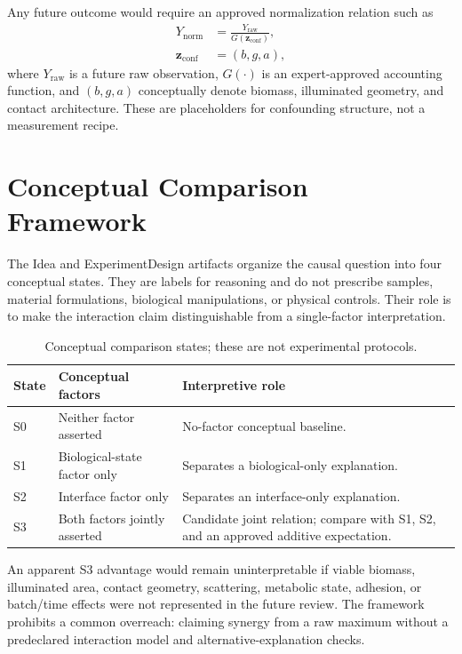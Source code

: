\documentclass[conference]{IEEEtran}
\begin{document}
Any future outcome would require an approved normalization relation such as
\begin{equation}
  \begin{aligned}
    Y_{\mathrm{norm}} &=
    \frac{Y_{\mathrm{raw}}}{G(\mathbf{z}_{\mathrm{conf}})},\\
    \mathbf{z}_{\mathrm{conf}} &= (b,g,a),
  \end{aligned}
  \label{eq:normalization}
\end{equation}
where $Y_{\mathrm{raw}}$ is a future raw observation, $G(\cdot)$ is an expert-approved accounting function, and $(b,g,a)$ conceptually denote biomass, illuminated geometry, and contact architecture. These are placeholders for confounding structure, not a measurement recipe.

\section{Conceptual Comparison Framework}

The Idea and ExperimentDesign artifacts organize the causal question into four conceptual states. They are labels for reasoning and do not prescribe samples, material formulations, biological manipulations, or physical controls. Their role is to make the interaction claim distinguishable from a single-factor interpretation.

\begin{table}[t]
\caption{Conceptual comparison states; these are not experimental protocols.}
\label{tab:conceptual-states}
\centering
\footnotesize
\renewcommand{\arraystretch}{1.14}
\setlength{\tabcolsep}{2pt}
\begin{tabular}{p{}p{}p{}}
\toprule
\textbf{State} & \textbf{Conceptual factors} & \textbf{Interpretive role} \\
\midrule
S0 & Neither factor asserted & No-factor conceptual baseline. \\
S1 & Biological-state factor only & Separates a biological-only explanation. \\
S2 & Interface factor only & Separates an interface-only explanation. \\
S3 & Both factors jointly asserted & Candidate joint relation; compare with S1, S2, and an approved additive expectation. \\
\bottomrule
\end{tabular}
\end{table}

An apparent S3 advantage would remain uninterpretable if viable biomass, illuminated area, contact geometry, scattering, metabolic state, adhesion, or batch/time effects were not represented in the future review. The framework prohibits a common overreach: claiming synergy from a raw maximum without a predeclared interaction model and alternative-explanation checks.
\end{document}
